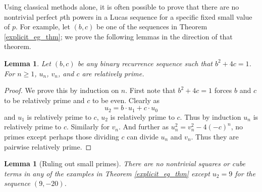 \documentclass[12pt]{amsart}
\newtheorem{lem}[thm]{Lemma}
\theoremstyle{definition}
\begin{document}
Using classical methods alone, it is often possible to prove that there are no nontrivial perfect $p$th powers in a Lucas sequence for a specific fixed small value of $p$.  For example, let $(b,c)$ be one of the sequences in Theorem \ref{explicit_eg_thm}; we prove the following lemmas in the direction of that theorem.

\begin{lem}\label{relprime}
Let $(b,c)$ be any binary recurrence sequence such that $b^2+4c=1$.  For $n \geq 1$,  $u_n$, $v_n$, and $c$ are relatively prime.
\end{lem}

\begin{proof}
We prove this by induction on $n$.  First note that $b^2 +4c = 1$ forces $b$ and $c$ to be relatively prime and $c$ to be even.  Clearly as
\[ u_2 = b \cdot u_1 + c \cdot u_0 \]
and $u_1$ is relatively prime to $c$, $u_2$ is relatively prime to $c$.  Thus by induction $u_n$ is relatively prime to $c$.  Similarly for $v_n$.  And further as $u_n^2  = v_n^2 - 4(-c)^n$, no primes except perhaps those dividing $c$ can divide $u_n$ and $v_n$.  Thus they are pairwise relatively prime.
\end{proof}

\begin{lem}[Ruling out small primes]\label{smallp}
There are no nontrivial squares or cube terms in any of the examples in Theorem \ref{explicit_eg_thm} except $u_2 = 9$ for the sequence $(9,-20)$.
\end{lem}
\end{document}
